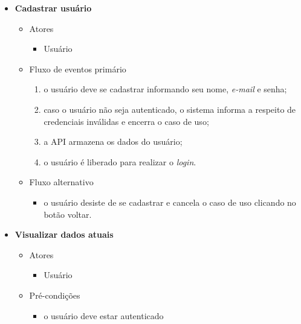\begin{itemize}
	\item \textbf{Cadastrar usuário}

		\begin{itemize}
    		\item Atores
		    	\begin{itemize}
    		    	\item Usuário
		    	\end{itemize}

	    	\item Fluxo de eventos primário
			    \begin{enumerate}
	    		    \item o usuário deve se cadastrar informando seu nome, \textit{e-mail} e senha;
	        		\item caso o usuário não seja autenticado, o sistema informa a respeito de credenciais inválidas e encerra o caso de uso;
		        	\item a API armazena os dados do usuário;
		    	    \item o usuário é liberado para realizar o \textit{login}.
			    \end{enumerate}

    		\item Fluxo alternativo
			    \begin{itemize}
		    	   \item o usuário desiste de se cadastrar e cancela o caso de uso clicando no botão voltar.
	    		\end{itemize}

		\end{itemize}

	\item \textbf{Visualizar dados atuais}

		\begin{itemize}
		    \item Atores
	    		\begin{itemize}
		    	    \item Usuário
			    \end{itemize}
    
	    	\item Pré-condições
			    \begin{itemize}
		     	   \item o usuário deve estar autenticado
			    \end{itemize}


\end{itemize}
\end{itemize}
